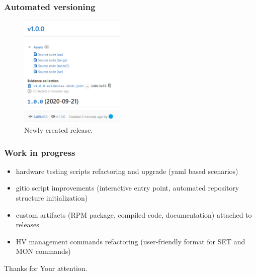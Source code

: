 \documentclass[10pt]{beamer}
\begin{document}
\begin{frame}[fragile]
\frametitle{Automated versioning}
\begin{figure}
    \centering
    \includegraphics[width=0.45\textwidth]{resources/new_release.PNG}
    \caption{Newly created release.}
\end{figure}
\end{frame}


\begin{frame}[fragile]
\frametitle{Work in progress}
\begin{itemize}
    \item hardware testing scripts refactoring and upgrade (yaml based scenarios)
    \item gitio script improvements (interactive entry point, automated repository structure initialization)
    \item custom artifacts (RPM package, compiled code, documentation) attached to releases
    \item HV management commands refactoring (user-friendly format for SET and MON commands)
\end{itemize}
\end{frame}

\begin{frame}[c]
\hfill
\begin{center}
\large{
	Thanks for Your attention.
}
\hfill
\end{center}
\end{frame}
\end{document}
